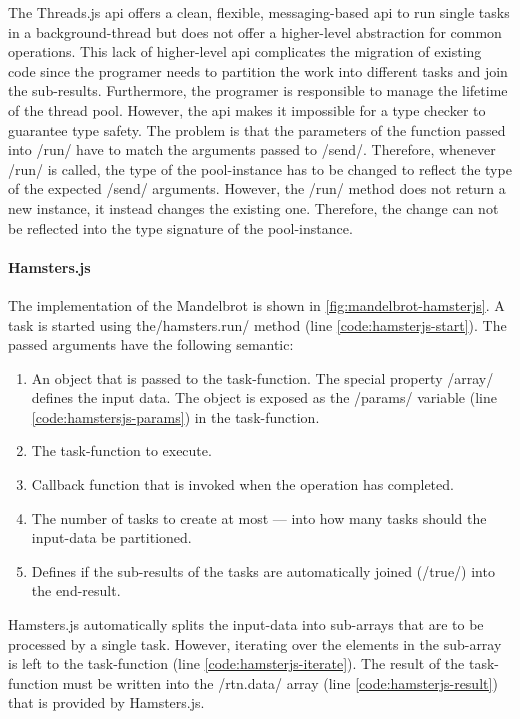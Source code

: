 The Threads.js api offers a clean, flexible, messaging-based api to run single tasks in a background-thread but does not offer a higher-level abstraction for common operations. This lack of higher-level api complicates the migration of existing code since the programer needs to partition the work into different tasks and join the sub-results. Furthermore, the programer is responsible to manage the lifetime of the thread pool. However, the api makes it impossible for a type checker to guarantee type safety. The problem is that the parameters of the function passed into \javascriptinline/run/ have to match the arguments passed to \javascriptinline/send/. Therefore, whenever \javascriptinline/run/ is called, the type of the pool-instance has to be changed to reflect the type of the expected \javascriptinline/send/ arguments. However, the \javascriptinline/run/ method does not return a new instance, it instead changes the existing one. Therefore, the change can not be reflected into the type signature of the pool-instance.

\paragraph{Hamsters.js}
The implementation of the Mandelbrot is shown in \cref{fig:mandelbrot-hamsterjs}. A task is started using the\javascriptinline/hamsters.run/ method (line \ref{code:hamsterjs-start}). The passed arguments have the following semantic:

\begin{enumerate}
	\item An object that is passed to the task-function. The special property \javascriptinline/array/ defines the input data. The object is exposed as the \javascriptinline/params/ variable (line \ref{code:hamstersjs-params}) in the task-function.
	\item The task-function to execute.
	\item Callback function that is invoked when the operation has completed.
	\item The number of tasks to create at most --- into how many tasks should the input-data be partitioned. 
	\item Defines if the sub-results of the tasks are automatically joined (\javascriptinline/true/) into the end-result.
\end{enumerate}

Hamsters.js automatically splits the input-data into sub-arrays that are to be processed by a single task. However, iterating over the elements in the sub-array is left to the task-function (line \ref{code:hamsterjs-iterate}). The result of the task-function must be written into the \javascriptinline/rtn.data/ array (line \ref{code:hamsterjs-result}) that is provided by Hamsters.js. 

